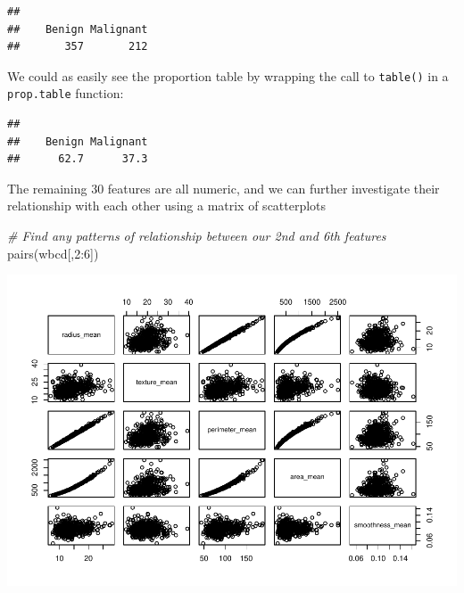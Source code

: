 \documentclass[
]{article}
\newenvironment{Shaded}{\begin{snugshade}}{\end{snugshade}}
\newcommand{\CommentTok}[1]{\textcolor[rgb]{0.56,0.35,0.01}{\textit{#1}}}
\newcommand{\DecValTok}[1]{\textcolor[rgb]{0.00,0.00,0.81}{#1}}
\newcommand{\FunctionTok}[1]{\textcolor[rgb]{0.00,0.00,0.00}{#1}}
\newcommand{\NormalTok}[1]{#1}
\newcommand{\SpecialCharTok}[1]{\textcolor[rgb]{0.00,0.00,0.00}{#1}}
\begin{document}
\begin{verbatim}
## 
##    Benign Malignant 
##       357       212
\end{verbatim}

We could as easily see the proportion table by wrapping the call to
\texttt{table()} in a \texttt{prop.table} function:

\begin{Shaded}
\end{Shaded}

\begin{verbatim}
## 
##    Benign Malignant 
##      62.7      37.3
\end{verbatim}

The remaining 30 features are all numeric, and we can further
investigate their relationship with each other using a matrix of
scatterplots

\begin{Shaded}
\begin{Highlighting}[]
\CommentTok{\# Find any patterns of relationship between our 2nd and 6th features}
\FunctionTok{pairs}\NormalTok{(wbcd[,}\DecValTok{2}\SpecialCharTok{:}\DecValTok{6}\NormalTok{])}
\end{Highlighting}
\end{Shaded}

\includegraphics{classification1_files/figure-latex/unnamed-chunk-62-1.pdf}
\end{document}
